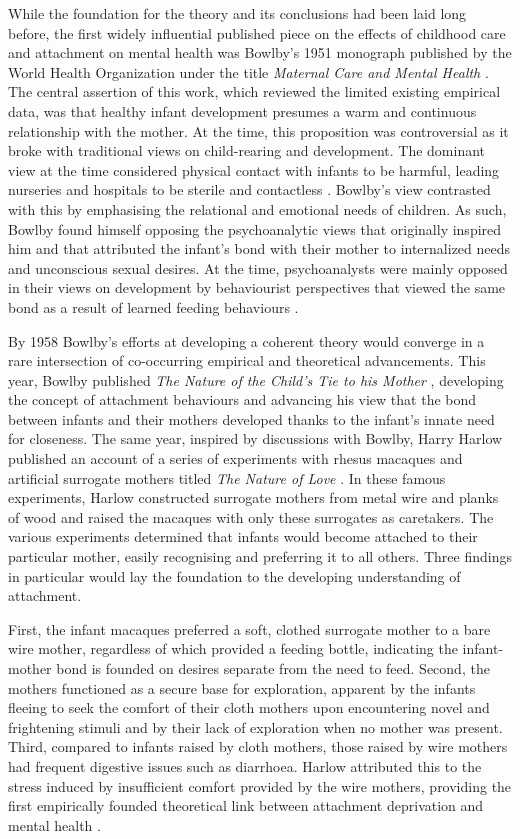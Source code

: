 \documentclass[12pt]{report}
\begin{document}
While the foundation for the theory and its conclusions had been laid long before, the first widely influential published piece on the effects of childhood care and attachment on mental health was Bowlby's 1951 monograph published by the World Health Organization under the title \textit{Maternal Care and Mental Health} \cite{bowlby1951WHO}.
The central assertion of this work, which reviewed the limited existing empirical data, was that healthy infant development presumes a warm and continuous relationship with the mother.
At the time, this proposition was controversial as it broke with traditional views on child-rearing and development. The dominant view at the time considered physical contact with infants to be harmful, leading nurseries and hospitals to be sterile and contactless \cite{Karen1994}.
Bowlby's view contrasted with this by emphasising the relational and emotional needs of children. As such, Bowlby found himself opposing the psychoanalytic views that originally inspired him and that attributed the infant's bond with their mother to internalized needs and unconscious sexual desires.
At the time, psychoanalysts were mainly opposed in their views on development by behaviourist perspectives that viewed the same bond as a result of learned feeding behaviours \cite{Mikulincer2003}.

By 1958 Bowlby's efforts at developing a coherent theory would converge in a rare intersection of co-occurring empirical and theoretical advancements.
This year, Bowlby published \textit{The Nature of the Child's Tie to his Mother} \cite{Bowlby1958}, developing the concept of attachment behaviours and advancing his view that the bond between infants and their mothers developed thanks to the infant's innate need for closeness.
The same year, inspired by discussions with Bowlby, Harry Harlow published an account of a series of experiments with rhesus macaques and artificial surrogate mothers titled \textit{The Nature of Love} \cite{Harlow1958}.
In these famous experiments, Harlow constructed surrogate mothers from metal wire and planks of wood and raised the macaques with only these surrogates as caretakers. The various experiments determined that infants would become attached to their particular mother, easily recognising and preferring it to all others.
Three findings in particular would lay the foundation to the developing understanding of attachment.

First, the infant macaques preferred a soft, clothed surrogate mother to a bare wire mother, regardless of which provided a feeding bottle, indicating the infant-mother bond is founded on desires separate from the need to feed.
Second, the mothers functioned as a secure base for exploration, apparent by the infants fleeing to seek the comfort of their cloth mothers upon encountering novel and frightening stimuli and by their lack of exploration when no mother was present.
Third, compared to infants raised by cloth mothers, those raised by wire mothers had frequent digestive issues such as diarrhoea.
Harlow attributed this to the stress induced by insufficient comfort provided by the wire mothers, providing the first empirically founded theoretical link between attachment deprivation and mental health \cite{Harlow1958}.
\end{document}
